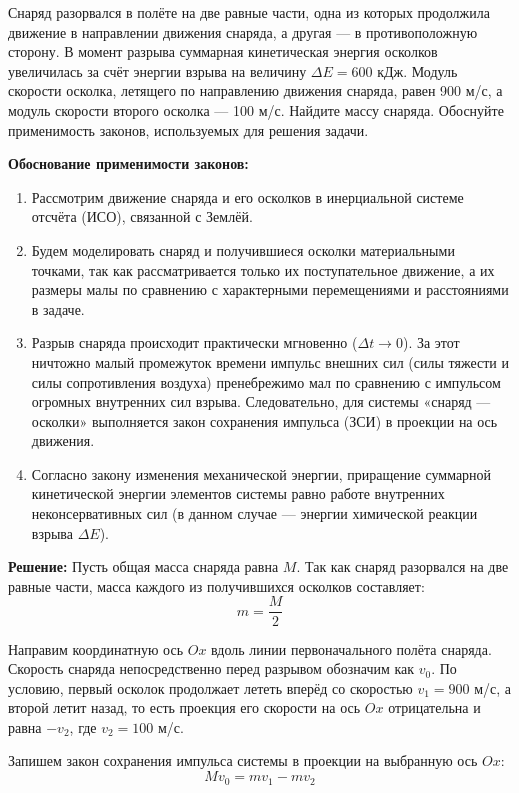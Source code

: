 \begin{taskadvanced}
Снаряд разорвался в полёте на две равные части, одна из которых продолжила движение в направлении движения снаряда, а другая — в противоположную сторону. В момент разрыва суммарная кинетическая энергия осколков увеличилась за счёт энергии взрыва на величину $\Delta E = 600$ кДж. Модуль скорости осколка, летящего по направлению движения снаряда, равен 900 м/с, а модуль скорости второго осколка — 100 м/с. Найдите массу снаряда. Обоснуйте применимость законов, используемых для решения задачи.

\begin{solutionbox}
\textbf{Обоснование применимости законов:}
\begin{enumerate}[leftmargin=*]
    \item Рассмотрим движение снаряда и его осколков в инерциальной системе отсчёта (ИСО), связанной с Землёй.
    \item Будем моделировать снаряд и получившиеся осколки материальными точками, так как рассматривается только их поступательное движение, а их размеры малы по сравнению с характерными перемещениями и расстояниями в задаче.
    \item Разрыв снаряда происходит практически мгновенно ($\Delta t \to 0$). За этот ничтожно малый промежуток времени импульс внешних сил (силы тяжести и силы сопротивления воздуха) пренебрежимо мал по сравнению с импульсом огромных внутренних сил взрыва. Следовательно, для системы «снаряд — осколки» выполняется закон сохранения импульса (ЗСИ) в проекции на ось движения.
    \item Согласно закону изменения механической энергии, приращение суммарной кинетической энергии элементов системы равно работе внутренних неконсервативных сил (в данном случае — энергии химической реакции взрыва $\Delta E$).
\end{enumerate}

\textbf{Решение:}
Пусть общая масса снаряда равна $M$. Так как снаряд разорвался на две равные части, масса каждого из получившихся осколков составляет:
$$m = \frac{M}{2}$$

Направим координатную ось $Ox$ вдоль линии первоначального полёта снаряда. Скорость снаряда непосредственно перед разрывом обозначим как $v_0$. По условию, первый осколок продолжает лететь вперёд со скоростью $v_1 = 900$ м/с, а второй летит назад, то есть проекция его скорости на ось $Ox$ отрицательна и равна $-v_2$, где $v_2 = 100$ м/с.

Запишем закон сохранения импульса системы в проекции на выбранную ось $Ox$:
$$M v_0 = m v_1 - m v_2$$


\end{solutionbox}
\end{taskadvanced}
